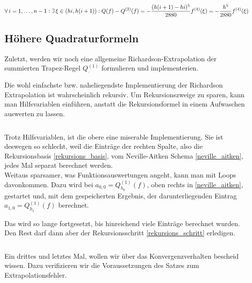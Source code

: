 \begin{align*}
    \forall \, i = 1, \ldots, n-1:
    \exists \, \xi \in (hi, h(i+1)):
    Q(f) - Q^{(2)}(f)
      = - \frac{(h(i+1) - hi)^5}{2880} f^{(4)}(\xi)
      = - \frac{h^5}{2880} f^{(4)}(\xi)
\end{align*}

\subsection{Höhere Quadraturformeln}

Zuletzt, werden wir noch eine allgemeine Richardson-Extrapolation der summierten Trapez-Regel $Q_\cdot^{(1)}$ formulieren und implementerien.



Die wohl einfachste bzw. naheliegendste Implementierung der Richardson Extrapolation ist wahrscheinlich rekursiv. Um Rekursionszweige zu sparen, kann man Hilfsvariablen einführen, anstatt die Rekursionsformel in einem Aufwaschen auswerten zu lassen.

\inputminted{python}{Aufgabe_2/python_code/ineffiziente_extrapolation.py}

Trotz Hilfsvariablen, ist die obere eine miserable Implementierung. Sie ist deswegen so schlecht, weil die Einträge der rechten Spalte, also die Rekursionsbasis \eqref{rekursions_basis}, vom Neville-Aitken Schema \eqref{neville_aitken}, jedes Mal separat berechnet werden. \\

Weitaus sparsamer, was Funktionsauswertungen angeht, kann man mit Loops davonkommen. Dazu wird bei $a_{0,0} = Q_{h_0}^{(1)}(f)$, oben rechts in \eqref{neville_aitken}, gestartet und, mit dem gespeicherten Ergebnis, der darunterliegenden Eintrag $a_{1,0} = Q_{h_1}^{(1)}(f)$ berechnet.



Das wird so lange fortgesetzt, bis hinreichend viele Einträge berechnet wurden. Den Rest darf dann aber der Rekursionsschritt \eqref{rekursions_schritt} erledigen.

\inputminted{python}{Aufgabe_2/python_code/effiziente_extrapolation.py}

Ein drittes und letztes Mal, wollen wir über das Konvergenzverhalten bescheid wissen. Dazu verifizieren wir die Voraussetzungen des Satzes zum Extrapolationsfehler. \\

